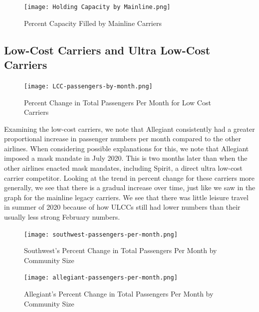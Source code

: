 \documentclass[11pt]{article}
\begin{document}
\begin{figure}[htbp!]
  \centerline{\texttt{[image: Holding Capacity by Mainline.png]}}
  \caption{Percent Capacity Filled by Mainline Carriers}
  \label{percent_capacity_mainline}
\end{figure}

\subsection{Low-Cost Carriers and Ultra Low-Cost Carriers}

\begin{figure}[htbp!]
  \centerline{\texttt{[image: LCC-passengers-by-month.png]}}
  \caption{Percent Change in Total Passengers Per Month for Low Cost Carriers}
  \label{passengers_monthly_lcc}
\end{figure}

Examining the low-cost carriers, we note that Allegiant consistently had a greater proportional increase in passenger numbers per month compared to the other airlines. When considering possible explanations for this, we note that Allegiant imposed a mask mandate in July 2020. This is two months later than when the other airlines enacted mask mandates, including Spirit, a direct ultra low-cost carrier competitor. Looking at the trend in percent change for these carriers more generally, we see that there is a gradual increase over time, just like we saw in the graph for the mainline legacy carriers. We see that there was little leisure travel in summer of 2020 because of how ULCCs still had lower numbers than their usually less strong February numbers.

\begin{figure}[htbp!]
  \centerline{\texttt{[image: southwest-passengers-per-month.png]}}
  \caption{Southwest's Percent Change in Total Passengers Per Month by Community Size}
  \label{southwest_passengers_monthly}
\end{figure}

\begin{figure}[htbp!]
  \centerline{\texttt{[image: allegiant-passengers-per-month.png]}}
  \caption{Allegiant's Percent Change in Total Passengers Per Month by Community Size}
  \label{allegiant_passengers_monthly}
\end{figure}
\end{document}
